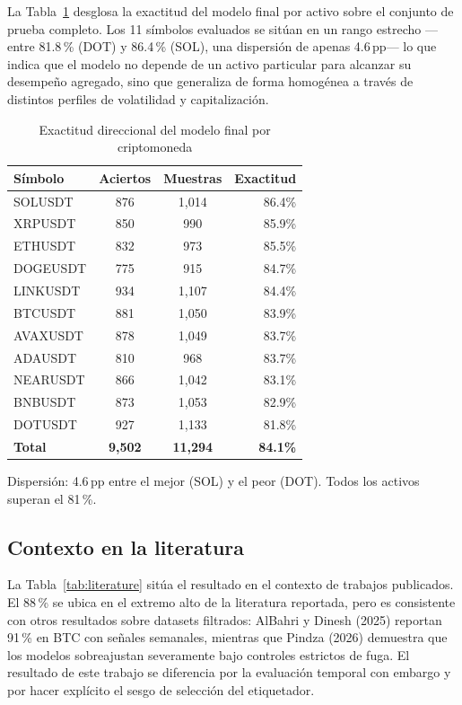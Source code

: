 \documentclass[10pt,twocolumn]{article}
\begin{document}
La Tabla~\ref{tab:persymbol} desglosa la exactitud del modelo final por activo sobre el conjunto de prueba completo. Los 11 s\'imbolos evaluados se sit\'uan en un rango estrecho ---entre 81.8\,\% (DOT) y 86.4\,\% (SOL), una dispersi\'on de apenas 4.6\,pp--- lo que indica que el modelo no depende de un activo particular para alcanzar su desempe\~no agregado, sino que generaliza de forma homog\'enea a trav\'es de distintos perfiles de volatilidad y capitalizaci\'on.

\begin{table}[H]
\centering
\caption{Exactitud direccional del modelo final por criptomoneda}
\label{tab:persymbol}
\footnotesize
\begin{tabularx}{\columnwidth}{Xccr}
\toprule
\textbf{S\'imbolo} & \textbf{Aciertos} & \textbf{Muestras} & \textbf{Exactitud} \\
\midrule
SOLUSDT & 876 & 1,014 & 86.4\% \\
XRPUSDT & 850 & 990 & 85.9\% \\
ETHUSDT & 832 & 973 & 85.5\% \\
DOGEUSDT & 775 & 915 & 84.7\% \\
LINKUSDT & 934 & 1,107 & 84.4\% \\
BTCUSDT & 881 & 1,050 & 83.9\% \\
AVAXUSDT & 878 & 1,049 & 83.7\% \\
ADAUSDT & 810 & 968 & 83.7\% \\
NEARUSDT & 866 & 1,042 & 83.1\% \\
BNBUSDT & 873 & 1,053 & 82.9\% \\
DOTUSDT & 927 & 1,133 & 81.8\% \\
\midrule
\textbf{Total} & \textbf{9,502} & \textbf{11,294} & \textbf{84.1\%} \\
\bottomrule
\end{tabularx}
{\scriptsize Dispersi\'on: 4.6\,pp entre el mejor (SOL) y el peor (DOT). Todos los activos superan el 81\,\%.}
\end{table}

\subsection{Contexto en la literatura}

La Tabla~\ref{tab:literature} sit\'ua el resultado en el contexto de trabajos publicados. El 88\,\% se ubica en el extremo alto de la literatura reportada, pero es consistente con otros resultados sobre datasets filtrados: AlBahri y Dinesh (2025) reportan 91\,\% en BTC con se\~nales semanales, mientras que Pindza (2026) demuestra que los modelos sobreajustan severamente bajo controles estrictos de fuga. El resultado de este trabajo se diferencia por la evaluaci\'on temporal con embargo y por hacer expl\'icito el sesgo de selecci\'on del etiquetador.
\end{document}
